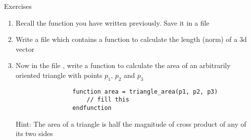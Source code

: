 \documentclass[%
    10pt,
    xcolor={dvipsnames},
    compress, %
]{beamer}
\newcommand{\hint}[1]{{\small\alert{Hint: #1}}}
\newcommand{\setitemsep}[1]{\setlength\itemsep{#1}}
\begin{document}
\begin{frame}[fragile]{Exercises}
    \begin{exercise}
        \begin{enumerate}
            \setitemsep{1em}
            \item Recall the  function you have written previously. Save it in a file 
            \item<2-> Write a file  which contains a function  to calculate the length (norm) of a 3d vector
            \item<3-> Now in the file , write a function to calculate the area of an arbitrarily oriented triangle with points $p_1$, $p_2$ and $p_3$
            \begin{lstlisting}
                function area = triangle_area(p1, p2, p3)
                    // fill this
                endfunction
            \end{lstlisting}
            \hint{The area of a triangle is half the magnitude of cross product of any of its two sides}
        \end{enumerate}
    \end{exercise}
\end{frame}
\end{document}
